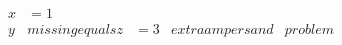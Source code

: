 \documentclass{article}
\begin{document}
\begin{align}
x &= 1 \\
y & missing equals
z &= 3 & extra ampersand & problem \\
\end{align}
\end{document}
